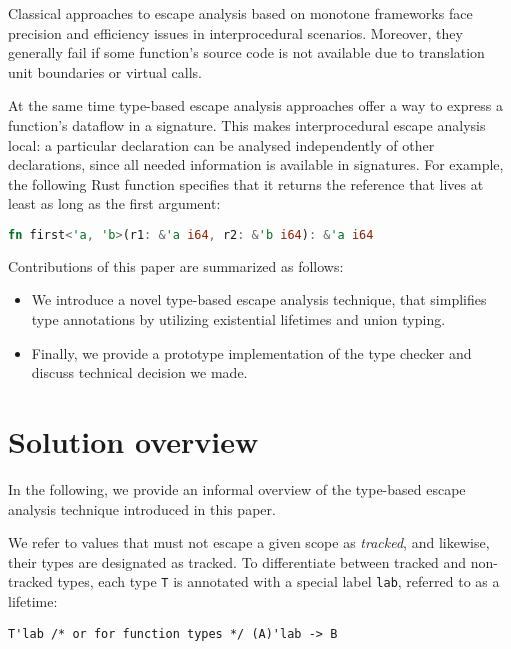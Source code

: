 \documentclass[11pt]{article}
\begin{document}
    Classical approaches to escape analysis based on monotone frameworks face precision and efficiency issues in interprocedural scenarios. %
    Moreover, they generally fail if some function's source code is not available due to translation unit boundaries or virtual calls.

    At the same time type-based escape analysis approaches offer a way to express a function's dataflow in a signature.
    This makes interprocedural escape analysis local: a particular declaration can be analysed independently of other declarations, since all needed information is available in signatures.
    For example, the following Rust function specifies that it returns the reference that lives at least as long as the first argument:
    \begin{lstlisting}[language=rust]
        fn first<'a, 'b>(r1: &'a i64, r2: &'b i64): &'a i64
    \end{lstlisting}



    Contributions of this paper are summarized as follows:
    \begin{itemize} %
        \item We introduce a novel type-based escape analysis technique, that simplifies type annotations by utilizing existential lifetimes and union typing.
        \item Finally, we provide a prototype implementation of the type checker and discuss technical decision we made.
    \end{itemize}


    \section{Solution overview}

    In the following, we provide an informal overview of the type-based escape analysis technique introduced in this paper.

    We refer to values that must not escape a given scope as \textit{tracked}, and likewise, their types are designated as tracked.
    To differentiate between tracked and non-tracked types, each type \lstinline[language=colang]|T| is annotated with a special label \lstinline[language=colang]|lab|, referred to as a lifetime:
    \begin{lstlisting}[language=colang]
        T'lab /* or for function types */ (A)'lab -> B
    \end{lstlisting}
\end{document}
